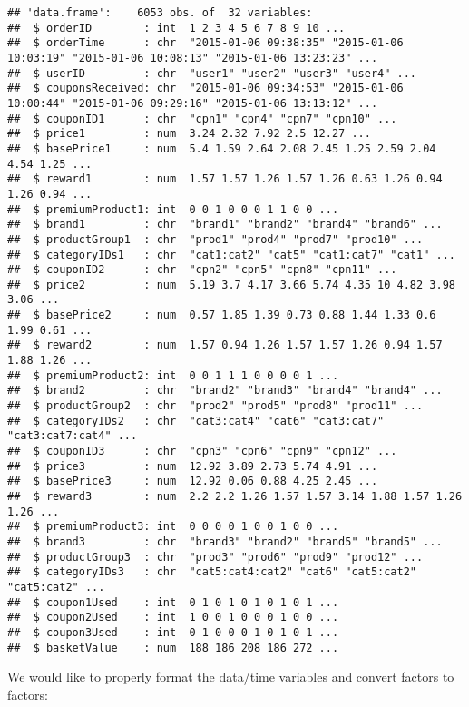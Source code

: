 \documentclass[10pt]{report}
\begin{document}
\begin{verbatim}
## 'data.frame':    6053 obs. of  32 variables:
##  $ orderID        : int  1 2 3 4 5 6 7 8 9 10 ...
##  $ orderTime      : chr  "2015-01-06 09:38:35" "2015-01-06 10:03:19" "2015-01-06 10:08:13" "2015-01-06 13:23:23" ...
##  $ userID         : chr  "user1" "user2" "user3" "user4" ...
##  $ couponsReceived: chr  "2015-01-06 09:34:53" "2015-01-06 10:00:44" "2015-01-06 09:29:16" "2015-01-06 13:13:12" ...
##  $ couponID1      : chr  "cpn1" "cpn4" "cpn7" "cpn10" ...
##  $ price1         : num  3.24 2.32 7.92 2.5 12.27 ...
##  $ basePrice1     : num  5.4 1.59 2.64 2.08 2.45 1.25 2.59 2.04 4.54 1.25 ...
##  $ reward1        : num  1.57 1.57 1.26 1.57 1.26 0.63 1.26 0.94 1.26 0.94 ...
##  $ premiumProduct1: int  0 0 1 0 0 0 1 1 0 0 ...
##  $ brand1         : chr  "brand1" "brand2" "brand4" "brand6" ...
##  $ productGroup1  : chr  "prod1" "prod4" "prod7" "prod10" ...
##  $ categoryIDs1   : chr  "cat1:cat2" "cat5" "cat1:cat7" "cat1" ...
##  $ couponID2      : chr  "cpn2" "cpn5" "cpn8" "cpn11" ...
##  $ price2         : num  5.19 3.7 4.17 3.66 5.74 4.35 10 4.82 3.98 3.06 ...
##  $ basePrice2     : num  0.57 1.85 1.39 0.73 0.88 1.44 1.33 0.6 1.99 0.61 ...
##  $ reward2        : num  1.57 0.94 1.26 1.57 1.57 1.26 0.94 1.57 1.88 1.26 ...
##  $ premiumProduct2: int  0 0 1 1 1 0 0 0 0 1 ...
##  $ brand2         : chr  "brand2" "brand3" "brand4" "brand4" ...
##  $ productGroup2  : chr  "prod2" "prod5" "prod8" "prod11" ...
##  $ categoryIDs2   : chr  "cat3:cat4" "cat6" "cat3:cat7" "cat3:cat7:cat4" ...
##  $ couponID3      : chr  "cpn3" "cpn6" "cpn9" "cpn12" ...
##  $ price3         : num  12.92 3.89 2.73 5.74 4.91 ...
##  $ basePrice3     : num  12.92 0.06 0.88 4.25 2.45 ...
##  $ reward3        : num  2.2 2.2 1.26 1.57 1.57 3.14 1.88 1.57 1.26 1.26 ...
##  $ premiumProduct3: int  0 0 0 0 1 0 0 1 0 0 ...
##  $ brand3         : chr  "brand3" "brand2" "brand5" "brand5" ...
##  $ productGroup3  : chr  "prod3" "prod6" "prod9" "prod12" ...
##  $ categoryIDs3   : chr  "cat5:cat4:cat2" "cat6" "cat5:cat2" "cat5:cat2" ...
##  $ coupon1Used    : int  0 1 0 1 0 1 0 1 0 1 ...
##  $ coupon2Used    : int  1 0 0 1 0 0 0 1 0 0 ...
##  $ coupon3Used    : int  0 1 0 0 0 1 0 1 0 1 ...
##  $ basketValue    : num  188 186 208 186 272 ...
\end{verbatim}

We would like to properly format the data/time variables and convert
factors to factors:
\end{document}
